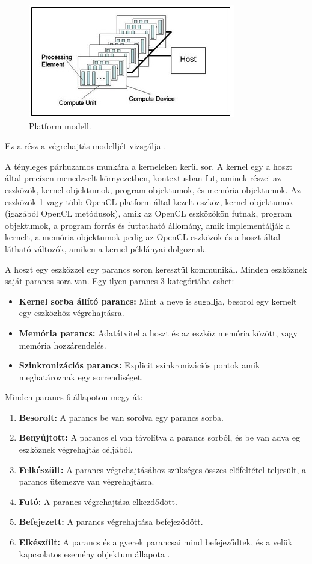 \begin{figure}[h]
\centering
\includegraphics[scale=1.0]{images/platform_modell.jpg}
\caption{Platform modell. \cite{spec}}
\label{fig:platform_modell}
\end{figure}

Ez a rész a végrehajtás modelljét vizsgálja \cite{spec}.

A tényleges párhuzamos munkára a kerneleken kerül sor. A kernel egy a hoszt által precízen menedzselt környezetben, kontextusban fut, aminek részei az eszközök, kernel objektumok, program objektumok, és memória objektumok. Az eszközök 1 vagy több OpenCL platform által kezelt eszköz, kernel objektumok (igazából OpenCL metódusok), amik az OpenCL eszközökön futnak, program objektumok, a program forrás és futtatható állomány, amik implementálják a kernelt, a memória objektumok pedig az OpenCL eszközök és a hoszt által látható változók, amiken a kernel példányai dolgoznak.

A hoszt egy eszközzel egy parancs soron keresztül kommunikál. Minden eszköznek saját parancs sora van. Egy ilyen parancs 3 kategóriába eshet:
\begin{itemize}
\item\textbf{Kernel sorba állító parancs:} Mint a neve is sugallja, besorol egy kernelt egy eszközhöz végrehajtásra.
\item\textbf{Memória parancs:} Adatátvitel a hoszt és az eszköz memória között, vagy memória hozzárendelés.
\item\textbf{Szinkronizációs parancs:} Explicit szinkronizációs pontok amik meghatároznak egy sorrendiséget.
\end{itemize}
Minden parancs 6 állapoton megy át:
\begin{enumerate}
\item\textbf{Besorolt:} A parancs be van sorolva egy parancs sorba.
\item\textbf{Benyújtott:} A parancs el van távolítva a parancs sorból, és be van adva eg eszköznek végrehajtás céljából.
\item\textbf{Felkészült:} A parancs végrehajtásához szükséges összes előfeltétel teljesült, a parancs ütemezve van végrehajtásra.
\item\textbf{Futó:} A parancs végrehajtása elkezdődött.
\item\textbf{Befejezett:} A parancs végrehajtása befejeződött.
\item\textbf{Elkészült:} A parancs és a gyerek parancsai mind befejeződtek, és a velük kapcsolatos esemény objektum állapota .
\end{enumerate}

